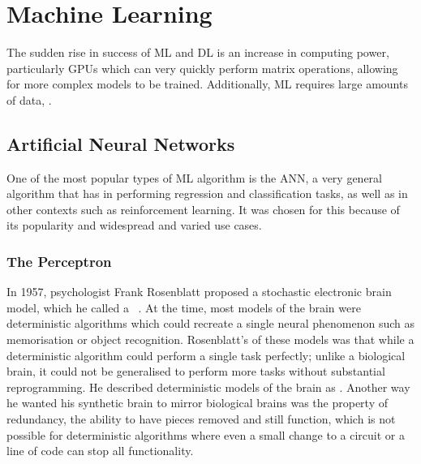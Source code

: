 
\chapter{Machine Learning}

The sudden rise in success of \ac{ML} and \ac{DL} is  an increase in computing power, particularly \acp{GPU} which can very quickly perform matrix operations, allowing for more complex models to be trained.
Additionally, \ac{ML} requires large amounts of data, .

\section{Artificial Neural Networks}

One of the most popular types of \ac{ML} algorithm is the \ac{ANN}, a very general algorithm that has  in performing regression and classification tasks, as well as in other contexts such as reinforcement learning.
It was chosen for this   because of its popularity and widespread and varied use cases.

\subsection{The Perceptron}

In 1957, psychologist Frank Rosenblatt proposed a stochastic electronic brain model, which he called a ~\autocite{rosenblatt1957}.
At the time, most models of the brain were deterministic algorithms which could recreate a single neural phenomenon such as memorisation or object recognition.
Rosenblatt's  of these models was that while a deterministic algorithm could perform a single task perfectly; unlike a biological brain, it could not be generalised to perform more tasks without substantial reprogramming.
He described deterministic models of the brain as .
Another way he wanted his synthetic brain to mirror biological brains was the property of redundancy, the ability to have pieces removed and still function, which is not possible for deterministic algorithms where even a small change to a circuit or a line of code can stop all functionality.

